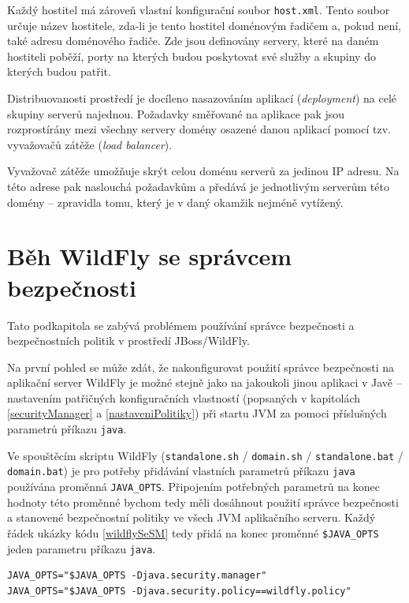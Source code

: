 Každý hostitel má zároveň vlastní konfigurační soubor {\tt host.xml}.
Tento soubor určuje název hostitele, zda-li je tento hostitel doménovým řadičem a, pokud není, také adresu doménového řadiče.
Zde jsou definovány servery, které na daném hostiteli poběží, porty na kterých budou poskytovat své služby a skupiny do kterých budou patřit.
\cite{jbossDomainSetup}

Distribuovanosti prostředí je docíleno nasazováním aplikací ({\it deployment}) na celé skupiny serverů najednou.
Požadavky směřované na aplikace pak jsou rozprostírány mezi všechny servery domény osazené danou aplikací pomocí tzv. vyvažovačů zátěže ({\it load balancer}).
\cite{jbossLoadBalancing}

Vyvažovač zátěže umožňuje skrýt celou doménu serverů za jedinou IP adresu.
Na této adrese pak naslouchá požadavkům a předává je jednotlivým serverům této domény -- zpravidla tomu, který je v daný okamžik nejméně vytížený.
\cite{jbossLoadBalancing}

\section{Běh WildFly se správcem bezpečnosti}

Tato podkapitola se zabývá problémem používání správce bezpečnosti a bezpečnostních politik v prostředí JBoss/WildFly.

Na první pohled se může zdát, že nakonfigurovat použití správce bezpečnosti na aplikační server WildFly je možné stejně jako na jakoukoli jinou aplikaci v Javě -- nastavením patřičných konfiguračních vlastností (popsaných v kapitolách \ref{securityManager} a \ref{nastaveniPolitiky}) při startu JVM za pomoci příslušných parametrů příkazu {\tt java}.

Ve spouštěcím skriptu WildFly ({\tt standalone.sh} / {\tt domain.sh} / {\tt standalone.bat} / {\tt domain.bat}) je pro potřeby přidávání vlastních parametrů příkazu {\tt java} používána proměnná {\tt JAVA\_OPTS}.
Připojením potřebných parametrů na konec hodnoty této proměnné bychom tedy měli dosáhnout použití správce bezpečnosti a stanovené bezpečnostní politiky ve všech JVM aplikačního serveru. Každý řádek ukázky kódu \ref{wildflySeSM} tedy přidá na konec proměnné {\tt \$JAVA\_OPTS} jeden parametru příkazu {\tt java}. \cite{jbossSecurityManager}

\begin{lstlisting}[caption=Doplnění spouštěcího skriptu o použití správce bezpečnosti, label=wildflySeSM]
JAVA_OPTS="$JAVA_OPTS -Djava.security.manager"
JAVA_OPTS="$JAVA_OPTS -Djava.security.policy==wildfly.policy"
\end{lstlisting}

